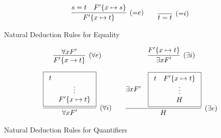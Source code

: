 \begin{definition}
\begin{table}[hbt]
	\begin{gather*}
	\infer[({=}e)]{F'\{x\mapsto t\}}{s=t & F'\{x\mapsto s\}}
	\qquad
	\infer[({=}i)]{t=t}{}
	\end{gather*}
	\caption{Natural Deduction Rules for Equality}\label{tab:natural:deduction:equality}
\end{table}

\begin{table}[hbt]
	\begin{gather*}
	\begin{array}{ccc}
	\infer[(\forall e)]{F'\{x\to t\}}{
		\forall x F'
	}
	&&
		\infer[(\exists i)]{\exists x F'}{
		F'\{x\mapsto t \}
	}
	\\[1em]
	\infer[(\forall i)]{\forall x F'}{
		\boxed{
			\begin{array}{cc}
				t
				\\
				&\vdots
				\\
				&F' \{x\mapsto t\}
			\end{array}} %
	}
	&&
	\infer[(\exists e)]{H}{
		\exists x F' &
		\boxed{
			\begin{array}{cc}
				t&F' \{ x\mapsto t \}
				\\
				&\vdots
				\\
				&H
			\end{array}} %
	}
	\end{array}
	\end{gather*}
	\caption{Natural Deduction Rules for Quantifiers}\label{tab:natural:deduction:quantifiers}
\end{table}
\end{definition}
